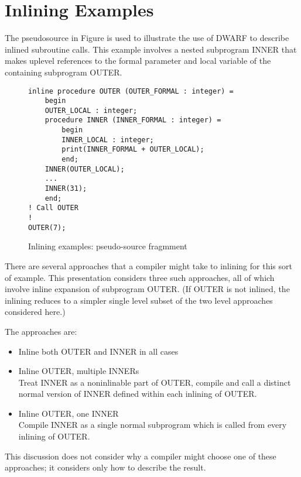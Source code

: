 \section{Inlining Examples}
\label{app:inliningexamples}
The pseudo\dash source in 
Figure 
is used to illustrate the
use of DWARF to describe inlined subroutine calls. This
example involves a nested subprogram INNER that makes uplevel
references to the formal parameter and local variable of the
containing subprogram OUTER.

\begin{figure}[here]
\begin{lstlisting}
inline procedure OUTER (OUTER_FORMAL : integer) =
    begin
    OUTER_LOCAL : integer;
    procedure INNER (INNER_FORMAL : integer) =
        begin
        INNER_LOCAL : integer;
        print(INNER_FORMAL + OUTER_LOCAL);
        end;
    INNER(OUTER_LOCAL);
    ...
    INNER(31);
    end;
! Call OUTER
!
OUTER(7);
\end{lstlisting}
\caption{Inlining examples: pseudo-source fragmment} \label{fig:inliningexamplespseudosourcefragment}
\end{figure}


There are several approaches that a compiler might take to
inlining for this sort of example. This presentation considers
three such approaches, all of which involve inline expansion
of subprogram OUTER. (If OUTER is not inlined, the inlining
reduces to a simpler single level subset of the two level
approaches considered here.)

The approaches are:

\begin{itemize}[1.]
\item  Inline both OUTER and INNER in all cases

\item Inline OUTER, multiple INNERs \\
Treat INNER as a non\dash inlinable part of OUTER, compile and
call a distinct normal version of INNER defined within each
inlining of OUTER.

\item Inline OUTER, one INNER \\
Compile INNER as a single normal subprogram which is called
from every inlining of OUTER.
\end{itemize}

This discussion does not consider why a compiler might choose
one of these approaches; it considers only how to describe
the result.

